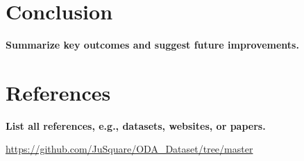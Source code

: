 \documentclass[12pt,a4paper]{article}
\begin{document}
\section{Conclusion}
\textbf{Summarize key outcomes and suggest future improvements.}

\section*{References}
\textbf{List all references, e.g., datasets, websites, or papers.}

\url{https://github.com/JuSquare/ODA_Dataset/tree/master}
\end{document}
